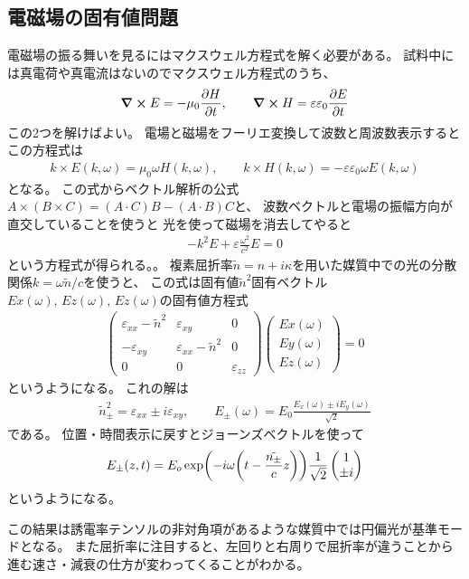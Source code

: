 \documentclass[9pt,dvipdfmx,a4paper]{jsarticle}
\begin{document}
\subsection{電磁場の固有値問題}
電磁場の振る舞いを見るにはマクスウェル方程式を解く必要がある。
試料中には真電荷や真電流はないのでマクスウェル方程式のうち、
\begin{align}
    \curl E = -\mu_0\pdv{H}{t},\qquad \curl{H} = \varepsilon\varepsilon_0 \pdv{E}{t}
\end{align}
この2つを解けばよい。
電場と磁場をフーリエ変換して波数と周波数表示するとこの方程式は
\begin{align}
    k \times E(k,\omega) = \mu_0 \omega H(k,\omega),\qquad
    k \times H(k,\omega) = -\varepsilon\varepsilon_0 \omega E(k,\omega)
\end{align}
となる。
この式からベクトル解析の公式\(A\times(B\times C) = (A\cdot C)B-(A\cdot B)C\)と、
波数ベクトルと電場の振幅方向が直交していることを使うと
光を使って磁場を消去してやると
\begin{align}
    - k^2 E +\varepsilon\frac{\omega^2}{c^2}E = 0
\end{align}
という方程式が得られる。。
複素屈折率\(\tilde{n}=n+i\kappa\)を用いた媒質中での光の分散関係\(k = \omega \tilde{n}/c\)を使うと、
この式は固有値\(\tilde{n}^2\)固有ベクトル\(Ex(\omega),\,Ez(\omega),\,Ez(\omega)\)の固有値方程式
\begin{align}
    \begin{pmatrix}
        \varepsilon_{xx}-\tilde{n}^2 & \varepsilon_{xy} & 0\\
        -\varepsilon_{xy} & \varepsilon_{xx}-\tilde{n}^2 & 0 \\
        0 & 0 & \varepsilon_{zz}
    \end{pmatrix}
    \begin{pmatrix}
        Ex(\omega)\\
        Ey(\omega)\\
        Ez(\omega)
    \end{pmatrix} = 0
\end{align}
というようになる。
これの解は
\begin{align}
    \tilde{n}^2_\pm = \varepsilon_{xx} \pm i\varepsilon_{xy},\qquad
    E_{\pm}(\omega) = E_0\frac{E_x(\omega)\pm iE_y(\omega)}{\sqrt{2}}
\end{align}
である。
位置・時間表示に戻すとジョーンズベクトルを使って
\begin{align}
    E_{\pm}(z, t) = E_o \exp(-i\omega\qty(t-\frac{\tilde{n_\pm}}{c}z)) \frac{1}{\sqrt{2}}
    \begin{pmatrix}
        1 \\ \pm i
    \end{pmatrix}
\end{align}
というようになる。

この結果は誘電率テンソルの非対角項があるような媒質中では円偏光が基準モードとなる。
また屈折率に注目すると、左回りと右周りで屈折率が違うことから進む速さ・減衰の仕方が変わってくることがわかる。
\end{document}
